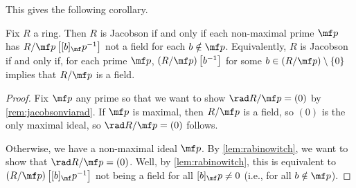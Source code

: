 \documentclass[../notes.tex]{subfiles}
\begin{document}
This gives the following corollary.
\begin{corollary}[Rabinowitch] \label{cor:betterjacobson}
	Fix $R$ a ring. Then $R$ is Jacobson if and only if each non-maximal prime $\mf p$ has $R/\mf p\left[[b]_\mf p^{-1}\right]$ not a field for each $b\notin\mf p$. Equivalently, $R$ is Jacobson if and only if, for each prime $\mf p$, $(R/\mf p)\left[b^{-1}\right]$ for some $b\in(R/\mf p)\setminus\{0\}$ implies that $R/\mf p$ is a field.
\end{corollary}
\begin{proof}
	Fix $\mf p$ any prime so that we want to show $\rad R/\mf p=(0)$ by \autoref{rem:jacobsonviarad}. If $\mf p$ is maximal, then $R/\mf p$ is a field, so $(0)$ is the only maximal ideal, so $\rad R/\mf p=(0)$ follows.

	Otherwise, we have a non-maximal ideal $\mf p$. By \autoref{lem:rabinowitch}, we want to show that $\rad R/\mf p=(0)$. Well, by \autoref{lem:rabinowitch}, this is equivalent to $(R/\mf p)\left[[b]_\mf p^{-1}\right]$ not being a field for all $[b]_\mf p\ne0$ (i.e., for all $b\notin\mf p$).
\end{proof}
\end{document}
